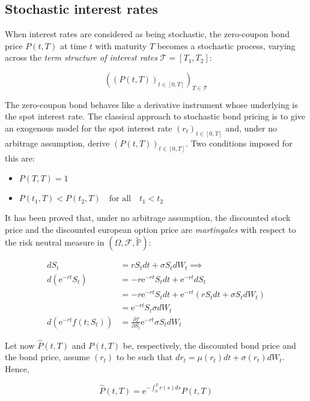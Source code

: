 \documentclass[oneside,titlepage,headinclude,12pt,a4paper,BCOR5mm,footinclude]{book}
\theoremstyle{defn}
\newcommand{\eexp}{\mathrm{e}}
\newcommand\de\partial
\begin{document}
\subsection{Stochastic interest rates}

When interest  rates are  considered as being  stochastic, the  zero-coupon bond
price  $P(t,T)$ at  time $t$  with maturity  $T$ becomes  a stochastic  process,
varying  across the  \textit{term structure  of interest  rates} $\mathcal{T}  =
[T_1,T_2]$:

\[
  \left( \left(P(t,T)\right)_{t \in [0,T]}\right)_{T\in \mathcal{T}}
\]

The zero-coupon  bond behaves like  a derivative instrument whose  underlying is
the spot interest rate. The classical  approach to stochastic bond pricing is to
give an  exogenous model for the  spot interest rate $(r_t)_{t  \in [0,T]}$ and,
under no  arbitrage assumption, derive $\left(P(t,T)\right)_{t  \in [0,T]}$. Two
conditions imposed for this are:

\begin{itemize}
  \item $ P(T,T) = 1 $
  \item $ P(t_1,T) <P (t_2,T) \quad \text{for all} \quad t_1 < t_2 $
\end{itemize}

It has  been proved that,  under no  arbitrage assumption, the  discounted stock
price and  the discounted  european option  price are  \textit{martingales} with
respect to the risk neutral measure in $(\Omega,\mathcal{F},\mathbb{\tilde P})$:

\begin{align*}
  dS_t &= rS_tdt + \sigma S_t dW_t \implies\\
  d(\eexp^{-rt}S_t) &= -r\eexp^{-rt}S_tdt+ \eexp^{-rt}dS_t \\
                    &= -r\eexp^{-rt}S_tdt + \eexp^{-rt}\left(rS_tdt+\sigma S_t dW_t\right) \\
                    &= \eexp^{-rt}S_t\sigma dW_t \\
  d(\eexp^{-rt}f(t;S_t)) & = \frac{\de f}{\de S_t}\eexp^{-rt}\sigma S_t dW_t
\end{align*}

Let now $\hat{P}(t,T)$ and $P(t,T)$  be, respectively, the discounted bond price
and  the bond  price,  assume $(r_t)$  to  be  such that  $dr_t  = \mu(r_t)dt  +
\sigma(r_t)dW_t$. Hence,

\[
  \hat{P}(t,T) = \eexp^{-\int_0^T r(s)ds}P(t,T)
\]
\end{document}

